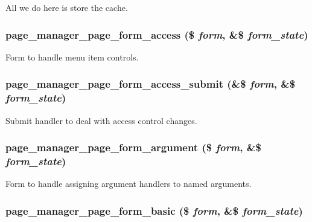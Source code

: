 All we do here is store the cache. \hypertarget{page_8admin_8inc_ac5237c0d37758abd050164f7cbf5bc21}{
\subsubsection[{page\_\-manager\_\-page\_\-form\_\-access}]{\setlength{\rightskip}{0pt plus 5cm}page\_\-manager\_\-page\_\-form\_\-access (\$ {\em form}, \/  \&\$ {\em form\_\-state})}}
\label{page_8admin_8inc_ac5237c0d37758abd050164f7cbf5bc21}
Form to handle menu item controls. \hypertarget{page_8admin_8inc_a7d39660f9cfbc37989482d7e6beea141}{
\subsubsection[{page\_\-manager\_\-page\_\-form\_\-access\_\-submit}]{\setlength{\rightskip}{0pt plus 5cm}page\_\-manager\_\-page\_\-form\_\-access\_\-submit (\&\$ {\em form}, \/  \&\$ {\em form\_\-state})}}
\label{page_8admin_8inc_a7d39660f9cfbc37989482d7e6beea141}
Submit handler to deal with access control changes. \hypertarget{page_8admin_8inc_a1ebb3c182dfee149f62fe0d590791129}{
\subsubsection[{page\_\-manager\_\-page\_\-form\_\-argument}]{\setlength{\rightskip}{0pt plus 5cm}page\_\-manager\_\-page\_\-form\_\-argument (\$ {\em form}, \/  \&\$ {\em form\_\-state})}}
\label{page_8admin_8inc_a1ebb3c182dfee149f62fe0d590791129}
Form to handle assigning argument handlers to named arguments. \hypertarget{page_8admin_8inc_a152056d6f47d7a9d2a28e6f906ff35b1}{
\subsubsection[{page\_\-manager\_\-page\_\-form\_\-basic}]{\setlength{\rightskip}{0pt plus 5cm}page\_\-manager\_\-page\_\-form\_\-basic (\$ {\em form}, \/  \&\$ {\em form\_\-state})}}
